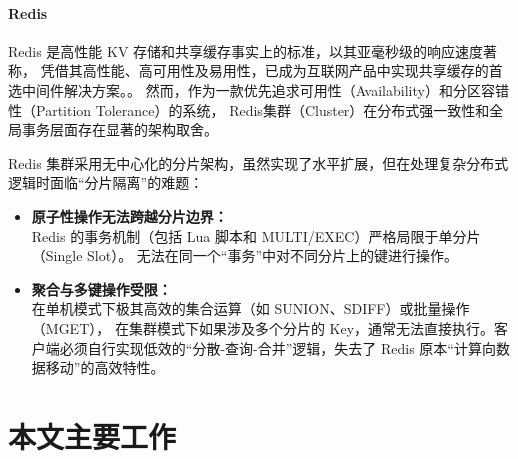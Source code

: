 \paragraph{Redis}
Redis 是高性能 KV 存储和共享缓存事实上的标准，以其亚毫秒级的响应速度著称，
凭借其高性能、高可用性及易用性，已成为互联网产品中实现共享缓存的首选中间件解决方案。。
然而，作为一款优先追求可用性（Availability）和分区容错性（Partition Tolerance）的系统，
Redis集群（Cluster）在分布式强一致性和全局事务层面存在显著的架构取舍。

Redis 集群采用无中心化的分片架构，虽然实现了水平扩展，但在处理复杂分布式逻辑时面临“分片隔离”的难题：
\begin{itemize}
    \item \textbf{原子性操作无法跨越分片边界：\\}
    Redis 的事务机制（包括 Lua 脚本和 MULTI/EXEC）严格局限于单分片（Single Slot）。
    无法在同一个“事务”中对不同分片上的键进行操作。
    \item \textbf{聚合与多键操作受限：\\}在单机模式下极其高效的集合运算（如 SUNION、SDIFF）或批量操作（MGET），
    在集群模式下如果涉及多个分片的 Key，通常无法直接执行。客户端必须自行实现低效的“分散-查询-合并”逻辑，失去了 Redis 原本“计算向数据移动”的高效特性。
\end{itemize}

\section{本文主要工作}
